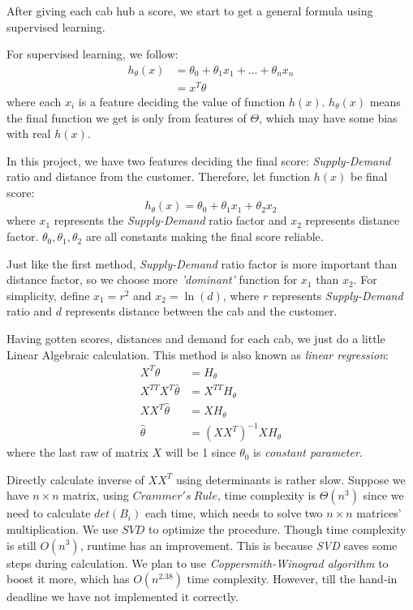 \documentclass{article}
\begin{document}
\qquad After giving each cab hub a score, we start to get a general formula using supervised learning.

\qquad For supervised learning, we follow:
\[
  \begin{split}
	h_\theta (x) &= {\theta}_0 + {\theta}_1 x_1 + ... + {\theta}_n x_n\\
    &=x^{T} \theta
  \end{split}
\]
where each \(x_i\) is a feature deciding the value of function \(h(x)\). \(h_\theta(x)\) means the final function we get is only from features of \(\Theta\), which may have some bias with real \(h(x)\).

\qquad In this project, we have two features deciding the final score: \emph{Supply-Demand} ratio and distance from the customer. Therefore, let function \(h(x)\) be final score:
\begin{displaymath}
	h_\theta(x)=\theta_0 + \theta_1 x_1 + \theta_2 x_2
\end{displaymath}
where \(x_1\) represents the \emph{Supply-Demand} ratio factor and \(x_2\) represents distance factor. \(\theta_0, \theta_1, \theta_2\) are all constants making the final score reliable.

\qquad Just like the first method, \emph{Supply-Demand} ratio factor is more important than distance factor, so we choose more \emph{'dominant'} function for \(x_1\) than \(x_2\). For simplicity, define \(x_1 = r^2\) and \(x_2 = \ln(d)\), where \(r\) represents \emph{Supply-Demand} ratio and \(d\) represents distance between the cab and the customer.

\qquad Having gotten scores, distances and demand for each cab, we just do a little Linear Algebraic calculation. This method is also known as \emph{linear regression}:
\[
	\begin{split}
		X^T \theta &= H_\theta\\
        X^{TT} X^{T}\hat{\theta} &= X^{TT} H_\theta\\
        XX^{T}\hat{\theta} &= XH_\theta\\
        \hat{\theta} &= {(XX^{T})}^{-1}XH_\theta
	\end{split}
\]
where the last raw of matrix \(X\) will be 1 since \(\theta_0\) is \emph{constant parameter}.

\qquad Directly calculate inverse of \(XX^{T}\) using determinants is rather slow. Suppose we have \(n\times n\) matrix, using \(Crammer's\ Rule\), time complexity is \(\Theta(n^3)\) since we need to calculate \(det (B_i)\) each time, which needs to solve two \(n\times n\) matrices' multiplication. We use \(SVD\) to optimize the procedure. Though time complexity is still \(O(n^3)\), runtime has an improvement. This is because \emph{SVD} saves some steps during calculation. We plan to use \emph{Coppersmith-Winograd algorithm} to boost it more, which has \(O(n^{2.38})\) time complexity. However, till the hand-in deadline we have not implemented it correctly.
\end{document}
